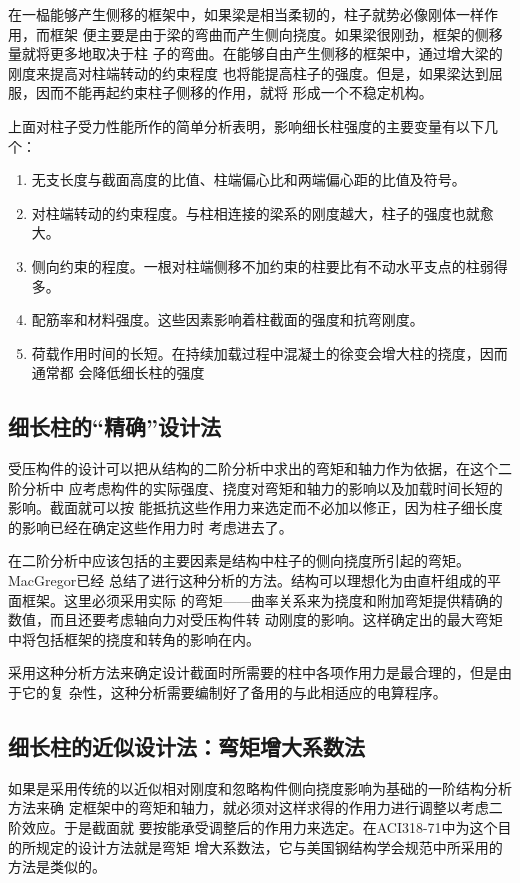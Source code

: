 \documentclass[12pt,a4paper]{book}
\begin{document}
在一榀能够产生侧移的框架中，如果梁是相当柔韧的，柱子就势必像刚体一样作用，而框架
便主要是由于梁的弯曲而产生侧向挠度。如果梁很刚劲，框架的侧移量就将更多地取决于柱
子的弯曲。在能够自由产生侧移的框架中，通过增大梁的刚度来提高对柱端转动的约束程度
也将能提高柱子的强度。但是，如果梁达到屈服，因而不能再起约束柱子侧移的作用，就将
形成一个不稳定机构。

上面对柱子受力性能所作的简单分析表明，影响细长柱强度的主要变量有以下几个：
\begin{enumerate}
\item 无支长度与截面高度的比值、柱端偏心比和两端偏心距的比值及符号。
\item 对柱端转动的约束程度。与柱相连接的梁系的刚度越大，柱子的强度也就愈大。
\item 侧向约束的程度。一根对柱端侧移不加约束的柱要比有不动水平支点的柱弱得多。
\item 配筋率和材料强度。这些因素影响着柱截面的强度和抗弯刚度。
\item 荷载作用时间的长短。在持续加载过程中混凝土的徐变会增大柱的挠度，因而通常都
  会降低细长柱的强度
\end{enumerate}

\subsection{细长柱的“精确”设计法}

受压构件的设计可以把从结构的二阶分析中求出的弯矩和轴力作为依据，在这个二阶分析中
应考虑构件的实际强度、挠度对弯矩和轴力的影响以及加载时间长短的影响。截面就可以按
能抵抗这些作用力来选定而不必加以修正，因为柱子细长度的影响已经在确定这些作用力时
考虑进去了。

在二阶分析中应该包括的主要因素是结构中柱子的侧向挠度所引起的弯矩。MacGregor已经
总结了进行这种分析的方法。结构可以理想化为由直杆组成的平面框架。这里必须采用实际
的弯矩——曲率关系来为挠度和附加弯矩提供精确的数值，而且还要考虑轴向力对受压构件转
动刚度的影响。这样确定出的最大弯矩中将包括框架的挠度和转角的影响在内。

采用这种分析方法来确定设计截面时所需要的柱中各项作用力是最合理的，但是由于它的复
杂性，这种分析需要编制好了备用的与此相适应的电算程序。

\subsection{细长柱的近似设计法：弯矩增大系数法}

如果是采用传统的以近似相对刚度和忽略构件侧向挠度影响为基础的一阶结构分析方法来确
定框架中的弯矩和轴力，就必须对这样求得的作用力进行调整以考虑二阶效应。于是截面就
要按能承受调整后的作用力来选定。在ACI318-71中为这个目的所规定的设计方法就是弯矩
增大系数法，它与美国钢结构学会规范中所采用的方法是类似的。
\end{document}
